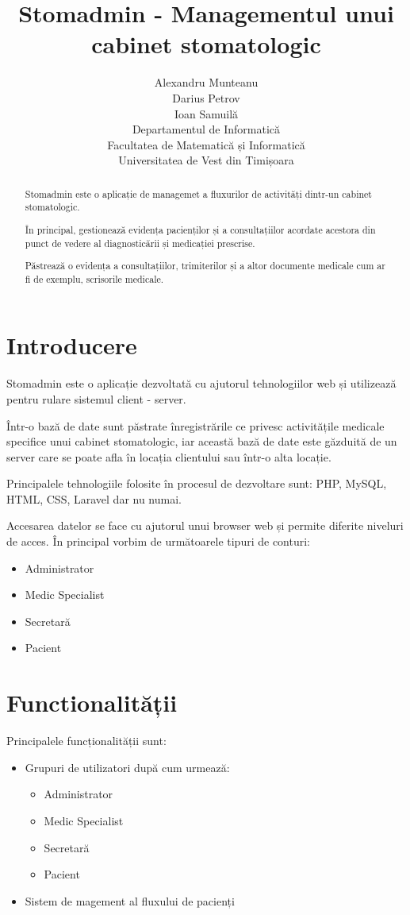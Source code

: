 \documentclass[a4paper,12pt]{article}
\title{Stomadmin - Managementul unui cabinet stomatologic}
\author{Alexandru Munteanu\\
Darius Petrov\\
Ioan Samuilă\\
Departamentul de Informatică\\
Facultatea de Matematică și Informatică\\
Universitatea de Vest din Timișoara}
\begin{document}
\maketitle
\begin{abstract}
Stomadmin este o aplicație de managemet a fluxurilor de activități dintr-un cabinet stomatologic.

 În principal, gestionează evidența pacienților și a consultațiilor acordate acestora din punct de vedere al diagnosticării și medicației prescrise. 

Păstrează o evidența a consultațiilor, trimiterilor și a altor documente medicale cum ar fi de exemplu, scrisorile medicale.  
\end{abstract}

\pagebreak

\tableofcontents

\pagebreak

\section{Introducere}

Stomadmin este o aplicație dezvoltată cu ajutorul tehnologiilor web și utilizează pentru rulare sistemul client - server.

Într-o bază de date sunt păstrate înregistrările ce privesc activitățile medicale specifice unui cabinet stomatologic, iar această bază de date este găzduită de un server care se poate afla în locația clientului sau într-o alta locație.

Principalele tehnologiile folosite în procesul de dezvoltare sunt: PHP, MySQL, HTML, CSS, Laravel dar nu numai. 

Accesarea datelor se face cu ajutorul unui browser web și permite diferite niveluri de acces. În principal vorbim de următoarele tipuri de conturi:

\begin{itemize}
\item Administrator
\item Medic Specialist
\item Secretară
\item Pacient
\end{itemize} 

\section{Functionalității}

Principalele funcționalității sunt:
\begin{itemize}
\item Grupuri de utilizatori după cum urmează:
\begin{itemize}
\item Administrator
\item Medic Specialist
\item Secretară
\item Pacient
\end{itemize}
\item Sistem de magement al fluxului de pacienți
\end{itemize}
\end{document}
